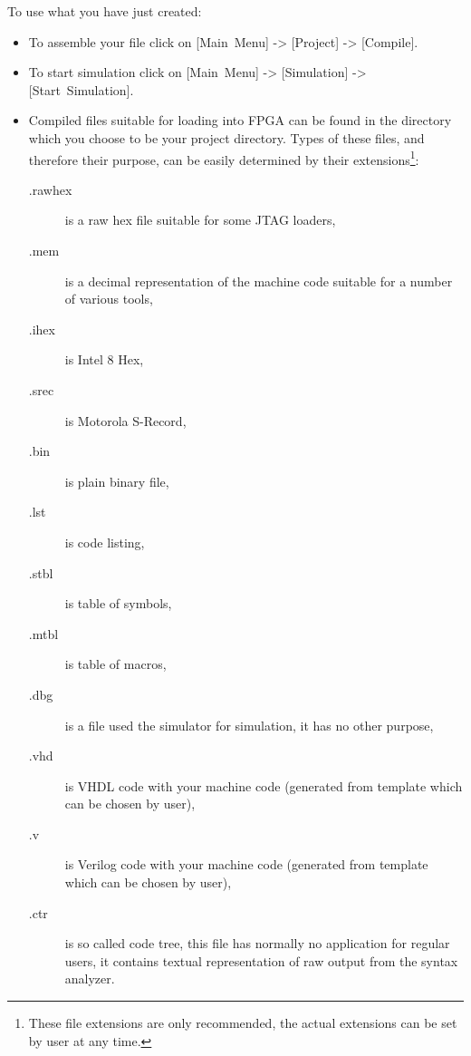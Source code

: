     To use what you have just created:
    \begin{itemize}
        \item To assemble your file click on [Main~Menu] -> [Project] -> [Compile].
        \item To start simulation click on [Main~Menu] -> [Simulation] -> [Start~Simulation].
        \item Compiled files suitable for loading into FPGA can be found in the directory which you choose to be your
              project directory. Types of these files, and therefore their purpose, can be easily determined by their
              extensions\footnote{These file extensions are only recommended, the actual extensions can be set by user
              at any time.}:
            \begin{description}
                \item [.rawhex] is a raw hex file suitable for some JTAG loaders,
                \item [.mem] is a decimal representation of the machine code suitable for a number of various tools,
                \item [.ihex] is Intel 8 Hex,
                \item [.srec] is Motorola S-Record,
                \item [.bin] is plain binary file,
                \item [.lst] is code listing,
                \item [.stbl] is table of symbols,
                \item [.mtbl] is table of macros,
                \item [.dbg] is a file used the simulator for simulation, it has no other purpose,
                \item [.vhd] is VHDL code with your machine code (generated from template which can be chosen by user),
                \item [.v] is Verilog code with your machine code (generated from template which can be chosen by user),
                \item [.ctr] is so called code tree, this file has normally no application for regular users, it
                      contains textual representation of raw output from the syntax analyzer.
            \end{description}
    \end{itemize}
